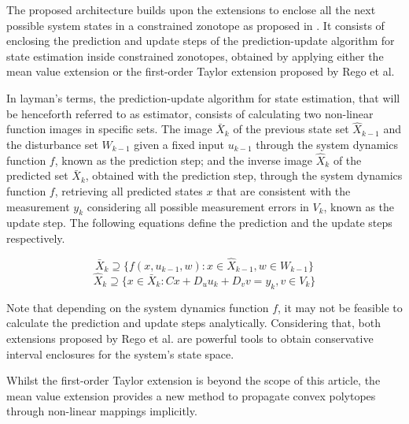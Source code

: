 \documentclass[conference]{IEEEtran}
\begin{document}
The proposed architecture builds upon the extensions to enclose all the next possible system states in a constrained zonotope as proposed in \cite{REGO2020108614}. It consists of enclosing the prediction and update steps of the prediction-update algorithm for state estimation inside constrained zonotopes, obtained by applying either the mean value extension or the first-order Taylor extension proposed by Rego et al.

In layman's terms, the prediction-update algorithm for state estimation, that will be henceforth referred to as estimator, consists of calculating two non-linear function images in specific sets. 
The image $\bar{X}_k$ of the previous state set $ \hat{X}_{k-1} $ and the disturbance set $ W_{k-1} $ given a fixed input $ u_{k-1}$  through the system dynamics function $f$, known as the prediction step; and the inverse image $\hat{X}_{k}$ of the predicted set $\bar{X}_k$, obtained with the prediction step, through the system dynamics function $f$, retrieving all predicted states $x$ that are consistent with the measurement $y_k$ considering all possible measurement errors in $V_k$, known as the update step. The following equations define the prediction and the update steps respectively.

\begin{equation}
    \bar{X}_k \supseteq \{f(x, u_{k-1}, w) : x \in \hat{X}_{k-1}, w \in W_{k-1} \}
\end{equation}
\begin{equation}
    \hat{X}_{k} \supseteq \{x \in \bar{X}_k : Cx + D_uu_k + D_vv = y_k, v \in V_k\}
\end{equation}

Note that depending on the system dynamics function $f$, it may not be feasible to calculate the prediction and update steps analytically. Considering that, both extensions proposed by Rego et al. are powerful tools to obtain conservative interval enclosures for the system's state space.



Whilst the first-order Taylor extension is beyond the scope of this article, the mean value extension provides a new method to propagate convex polytopes through non-linear mappings implicitly. 
\end{document}
